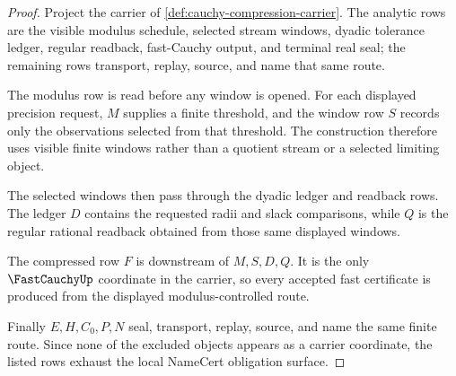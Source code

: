 \begin{proof}
Project the carrier of \autoref{def:cauchy-compression-carrier}. The analytic rows are the visible modulus schedule, selected stream windows, dyadic tolerance ledger, regular readback, fast-Cauchy output, and terminal real seal; the remaining rows transport, replay, source, and name that same route.

The modulus row is read before any window is opened. For each displayed precision request, $M$ supplies a finite threshold, and the window row $S$ records only the observations selected from that threshold. The construction therefore uses visible finite windows rather than a quotient stream or a selected limiting object.

The selected windows then pass through the dyadic ledger and readback rows. The ledger $D$ contains the requested radii and slack comparisons, while $Q$ is the regular rational readback obtained from those same displayed windows.

The compressed row $F$ is downstream of $M,S,D,Q$. It is the only $\FastCauchyUp$ coordinate in the carrier, so every accepted fast certificate is produced from the displayed modulus-controlled route.

Finally $E,H,C_0,P,N$ seal, transport, replay, source, and name the same finite route. Since none of the excluded objects appears as a carrier coordinate, the listed rows exhaust the local NameCert obligation surface.
\end{proof}

